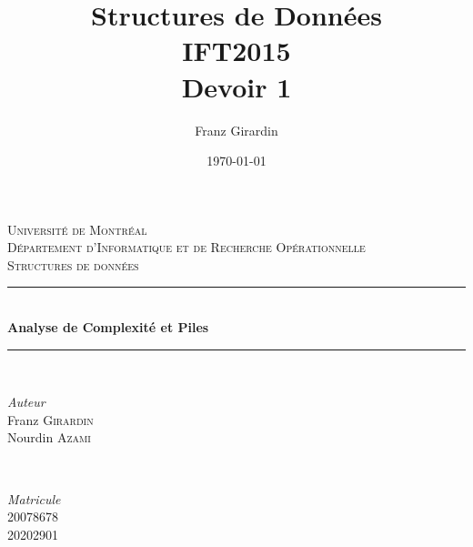 \documentclass[10pt]{report}
\title{\Huge{Structures de Données}\\{IFT2015}\\{\textbf{Devoir 1}}}
\author{\huge{Franz Girardin}}
\date{\today}
\begin{document}
\begin{titlepage} %
	\newcommand{\HRule}{\rule{\linewidth}{0.5mm}} %
	
	\center %
	
	
	\textsc{\LARGE Université de Montréal}\\[1.5cm] %
	
	\textsc{\Large Département d'Informatique et de Recherche Opérationnelle}\\[0.5cm] %
	
	\textsc{\large Structures de données}\\[0.5cm] %
	
	
	\HRule\\[0.4cm]
	
	{\huge\bfseries Analyse de Complexité et Piles}\\[0.4cm] %
	
	\HRule\\[1.5cm]
	
	
	\begin{minipage}{0.4\textwidth}
		\begin{flushleft}
			\large
			\textit{Auteur}\\
		Franz \textsc{Girardin} \\
    Nourdin \textsc{Azami}
		\end{flushleft}
	\end{minipage}
	~
	\begin{minipage}{0.4\textwidth}
		\begin{flushright}
			\large
			\textit{Matricule}\\
			\textsc{20078678} \\ 
			\textsc{20202901} 
		\end{flushright}
	\end{minipage}
	

\end{titlepage}
\end{document}
